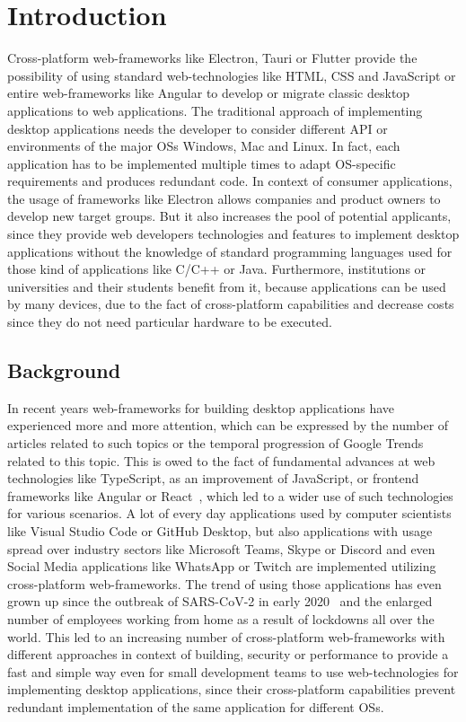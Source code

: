\section{Introduction}\label{sec:introduction}
Cross-platform web-frameworks like Electron, Tauri or Flutter provide the possibility of using standard web-technologies like \ac{HTML}, \ac{CSS} and JavaScript or entire web-frameworks
like Angular to develop or migrate classic desktop applications to web applications.
The traditional approach of implementing desktop applications needs the developer to consider different \ac{API} or environments of the major  \ac{OS}s
Windows, Mac and Linux.
In fact, each application has to be implemented multiple times to adapt \ac{OS}-specific requirements and produces redundant code.
In context of consumer applications, the usage of frameworks like Electron allows companies and product owners to develop new target groups.
But it also increases the pool of potential applicants, since they provide web developers technologies and features to implement desktop applications without the knowledge of standard programming languages used for those kind of applications like C/C++ or Java.
Furthermore, institutions or universities and their students benefit from it, because applications can be used by many devices, due to the fact of cross-platform capabilities and decrease costs
since they do not need particular hardware to be executed.

\subsection{Background}\label{subsec:background}
In recent years web-frameworks for building desktop applications have experienced more and more attention, which can be expressed by the number of articles related to such topics or the temporal progression of Google Trends related to this topic.
This is owed to the fact of fundamental advances at web technologies like TypeScript, as an improvement of JavaScript, or frontend frameworks like Angular or React~\cite{pernice:icalepcs2019-wempr006},
which led to a wider use of such technologies for various scenarios.
A lot of every day applications used by computer scientists like Visual Studio Code or GitHub Desktop, but also applications with usage spread over industry sectors
like Microsoft Teams, Skype or Discord and even Social Media applications like WhatsApp or Twitch are implemented utilizing cross-platform web-frameworks.
The trend of using those applications has even grown up since the outbreak of SARS-CoV-2 in early 2020~\cite{Gorbalenya2020} and the enlarged number of employees working from home
as a result of lockdowns all over the world.
This led to an increasing number of cross-platform web-frameworks with different approaches in context of building, security or performance to provide a fast and simple way even for small development teams
to use web-technologies for implementing desktop applications, since their cross-platform capabilities prevent redundant implementation of the same application for different \ac{OS}s.


